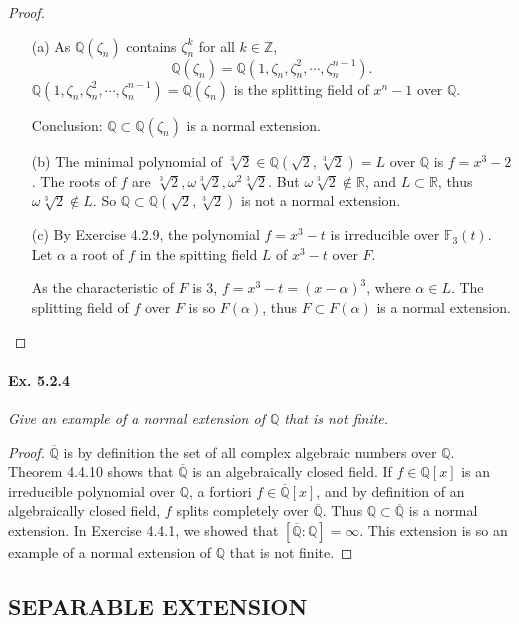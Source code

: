 \documentclass[11pt,a4paper]{article}
\newcommand{\Q}{\mathbb{Q}}
\newcommand{\Z}{\mathbb{Z}}
\newcommand{\R}{\mathbb{R}}
\newcommand{\F}{\mathbb{F}}
\begin{document}
\begin{proof}
\begin{enumerate}
\item[(a)]
As $\Q(\zeta_n)$ contains $\zeta_n^k$ for all $k \in \Z$, 
$$\Q(\zeta_n) = \Q(1,\zeta_n,\zeta_n^2,\cdots,\zeta_n^{n-1}).$$
$\Q(1,\zeta_n,\zeta_n^2,\cdots,\zeta_n^{n-1}) = \Q(\zeta_n)$ is the splitting field of $x^n-1$ over $\Q$. 

Conclusion:  $\Q \subset \Q(\zeta_n)$ is a normal extension.

\item[(b)]
The minimal polynomial of $\sqrt[3]{2} \in \Q(\sqrt{2}, \sqrt[3]{2} ) = L $ over $\Q$ is $f = x^3-2$. The roots of $f$ are $\sqrt[3]{2}, \omega \sqrt[3]{2}, \omega^2 \sqrt[3]{2}$. But $\omega \sqrt[3]{2} \not \in \R$, and $L \subset \R$, thus $\omega \sqrt[3]{2} \not \in L$. So  $\Q \subset  \Q(\sqrt{2}, \sqrt[3]{2} )$ is not a normal extension.

\item[(c)]
By Exercise 4.2.9, the polynomial $f = x^3-t$ is irreducible over $\F_3(t)$. Let $\alpha$ a root of $f$ in the spitting field $L$ of $x^3-t$ over $F$.

As the characteristic of $F$ is 3, $f = x^3-t = (x-\alpha)^3$, where $\alpha \in L$. The splitting field of $f$ over $F$ is so $F(\alpha)$, thus $F\subset F(\alpha)$ is a normal extension.
\end{enumerate}
\end{proof}

\paragraph{Ex. 5.2.4}

{\it Give an example of a normal extension of $\Q$ that is not finite.
}

\begin{proof}
$\overline{\Q}$ is by definition the set of all complex algebraic numbers over $\Q$. Theorem 4.4.10 shows that $\overline{\Q}$ is an algebraically closed field. If $f \in \Q[x]$ is an irreducible polynomial over $\Q$, a fortiori $f \in \overline{\Q}[x]$, and by definition of an algebraically closed field, $f$ splits completely over $\overline{\Q}$. Thus $\Q \subset \overline{\Q}$ is a normal extension.
In Exercise 4.4.1, we showed that $[\overline{\Q} : \Q] = \infty$. This extension is so an example of a normal extension of $\Q$ that is not finite.
\end{proof}

\subsection{SEPARABLE EXTENSION}
\end{document}
